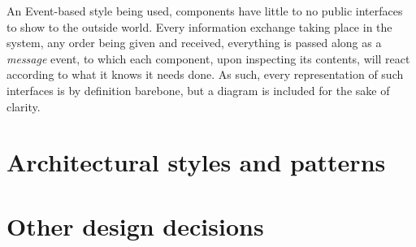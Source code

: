 An Event-based style being used, components have little to no public interfaces to show to the outside world. Every information exchange taking place in the system, any order being given and received, everything is passed along as a \emph{message} event, to which each component, upon inspecting its contents, will react according to what it knows it needs done. As such, every representation of such interfaces is by definition barebone, but a diagram is included for the sake of clarity.

\section{Architectural styles and patterns}


\section{Other design decisions}
